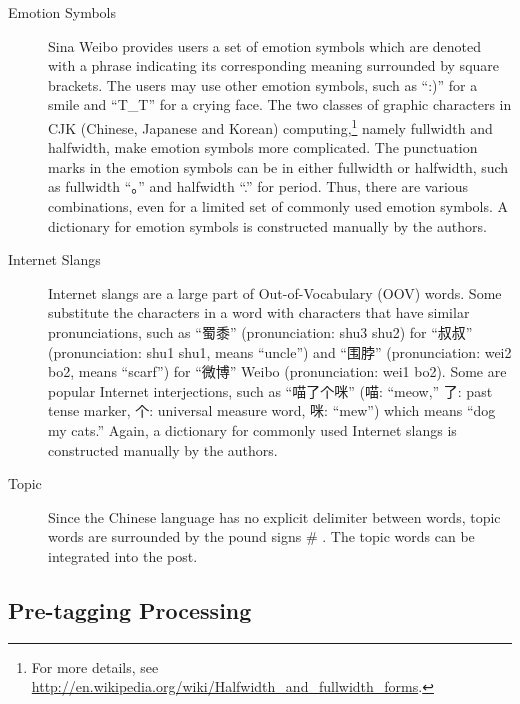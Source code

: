 \documentclass[11pt]{article}
\newcommand{\1}[1]{{\mathbf 1}\left\{#1\right\}}        %
\begin{document}
\begin{description}
\item[Emotion Symbols] Sina Weibo provides users a set of emotion symbols which are denoted with a phrase indicating its corresponding meaning surrounded by square brackets. The users may use other emotion symbols, such as ``:)'' for a smile and ``T\_T'' for a crying face. 
The two classes of graphic characters in CJK (Chinese, Japanese and Korean) computing,\footnote{For more details, see \url{http://en.wikipedia.org/wiki/Halfwidth_and_fullwidth_forms}.}
 namely fullwidth and halfwidth, make emotion symbols more complicated. The punctuation marks in the emotion symbols can be in either fullwidth or halfwidth, such as fullwidth ``。'' and halfwidth ``.'' for period. Thus, there are various combinations, even for a limited set of commonly used emotion symbols. A dictionary for emotion symbols is constructed manually by the authors.
 
\item[Internet Slangs] 
Internet slangs are a large part of Out-of-Vocabulary (OOV) words. Some substitute the characters in a word with characters that have similar pronunciations, such as ``蜀黍'' (pronunciation: shu3 shu2) for ``叔叔'' (pronunciation: shu1 shu1, means ``uncle'') and ``围脖'' (pronunciation: wei2 bo2, means ``scarf'') for ``微博'' Weibo (pronunciation: wei1 bo2). Some are popular Internet interjections, such as ``喵了个咪'' (喵: ``meow,'' 了: past tense marker, 个: universal measure word, 咪: ``mew'') which means ``dog my cats.'' Again, a dictionary for commonly used Internet slangs is constructed manually by the authors.


\item[Topic] Since the Chinese language has no explicit delimiter between words, topic words are surrounded by the pound signs {\ttfamily \#} . The topic words can be integrated into the post. 

\end{description}

 




\subsection{Pre-tagging Processing}
\end{document}

